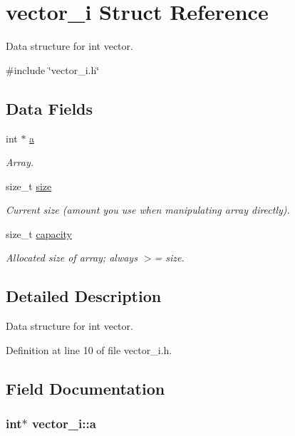 \hypertarget{structvector__i}{\section{vector\-\_\-i Struct Reference}
\label{structvector__i}
}


Data structure for int vector.  




{\ttfamily \#include \char`\"{}vector\-\_\-i.\-h\char`\"{}}

\subsection*{Data Fields}
\begin{DoxyCompactItemize}
\item 
int $\ast$ \hyperlink{structvector__i_a1f7c0e586cb1e09323dec3dd48d13882}{a}
\begin{DoxyCompactList}\small\item\em Array. \end{DoxyCompactList}\item 
size\-\_\-t \hyperlink{structvector__i_a8df52068982f4b7dcaa024b37f243282}{size}
\begin{DoxyCompactList}\small\item\em Current size (amount you use when manipulating array directly). \end{DoxyCompactList}\item 
size\-\_\-t \hyperlink{structvector__i_a8e7421832635519ee2ccebd19298b705}{capacity}
\begin{DoxyCompactList}\small\item\em Allocated size of array; always $>$= size. \end{DoxyCompactList}\end{DoxyCompactItemize}


\subsection{Detailed Description}
Data structure for int vector. 



Definition at line 10 of file vector\-\_\-i.\-h.



\subsection{Field Documentation}
\hypertarget{structvector__i_a1f7c0e586cb1e09323dec3dd48d13882}{
\subsubsection[{a}]{\setlength{\rightskip}{0pt plus 5cm}int$\ast$ vector\-\_\-i\-::a}}\label{structvector__i_a1f7c0e586cb1e09323dec3dd48d13882}


